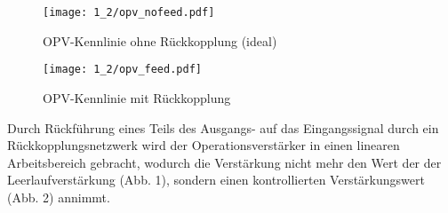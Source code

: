 \begin{figure}[H]
  \begin{center}
    \texttt{[image: 1\_2/opv\_nofeed.pdf]}
    \end{center}
    \caption{OPV-Kennlinie ohne Rückkopplung (ideal)}
 \end{figure}
\begin{figure}[H]
  \begin{center}
    \texttt{[image: 1\_2/opv\_feed.pdf]}
    \end{center}
    \caption{OPV-Kennlinie mit Rückkopplung}
 \end{figure}

Durch Rückführung eines Teils des Ausgangs- auf das Eingangssignal durch ein
Rückkopplungsnetzwerk wird der Operationsverstärker in einen linearen
Arbeitsbereich gebracht, wodurch die Verstärkung nicht mehr den Wert der der Leerlaufverstärkung (Abb. 1), sondern einen kontrollierten Verstärkungswert (Abb. 2) annimmt.
